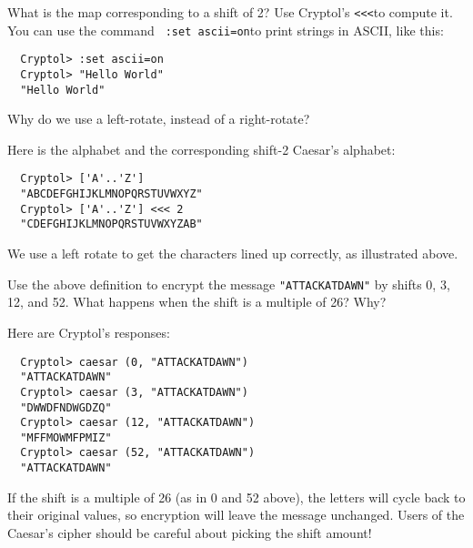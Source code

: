 \begin{Exercise}\label{ex:caesar:0}
  What is the map corresponding to a shift of 2? Use Cryptol's
  \verb+<<<+\indRotLeft to compute it.  You can use the command {\tt
    :set ascii=on}\indSettingASCII to print strings in ASCII, like
  this:
\begin{Verbatim}
  Cryptol> :set ascii=on
  Cryptol> "Hello World"
  "Hello World"
\end{Verbatim}
Why do we use a left-rotate, instead of a right-rotate?
\end{Exercise}
\begin{Answer}
Here is the alphabet and the corresponding shift-2 Caesar's alphabet:
\begin{verbatim}
  Cryptol> ['A'..'Z'] 
  "ABCDEFGHIJKLMNOPQRSTUVWXYZ"
  Cryptol> ['A'..'Z'] <<< 2
  "CDEFGHIJKLMNOPQRSTUVWXYZAB"
\end{verbatim}
We use a left rotate to get the characters lined up correctly, as
illustrated above.  \indRotLeft\indRotRight
\end{Answer}

\begin{Exercise}\label{ex:caesar:1}
  Use the above definition to encrypt the message {\tt "ATTACKATDAWN"}
  by shifts 0, 3, 12, and 52. What happens when the shift is a
  multiple of 26? Why?
\end{Exercise}
\begin{Answer}
Here are Cryptol's responses:
\begin{Verbatim}
  Cryptol> caesar (0, "ATTACKATDAWN")
  "ATTACKATDAWN"
  Cryptol> caesar (3, "ATTACKATDAWN")
  "DWWDFNDWGDZQ"
  Cryptol> caesar (12, "ATTACKATDAWN")
  "MFFMOWMFPMIZ"
  Cryptol> caesar (52, "ATTACKATDAWN")
  "ATTACKATDAWN"
\end{Verbatim}
If the shift is a multiple of 26 (as in 0 and 52 above), the letters
will cycle back to their original values, so encryption will leave the
message unchanged. Users of the Caesar's cipher should be careful
about picking the shift amount!
\end{Answer}

